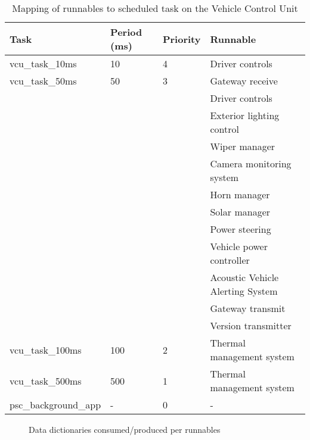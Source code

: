 \begin{table}[htb]
    \centering
\begin{tabular}{@{}llll@{}}
    \toprule
    Task                           & Period (ms) & Priority & Runnable                     \\ \midrule
    vcu\_task\_10ms                & 10          & 4        & Driver controls              \\
    vcu\_task\_50ms                & 50          & 3        & Gateway receive              \\
                                   &             &          & Driver controls              \\
                                   &             &          & Exterior lighting control    \\
                                   &             &          & Wiper manager                \\
                                   &             &          & Camera monitoring system     \\
                                   &             &          & Horn manager                 \\
                                   &             &          & Solar manager                \\
                                   &             &          & Power steering               \\
                                   &             &          & Vehicle power controller     \\
                                   &             &          & Acoustic Vehicle Alerting System \\
                                   &             &          & Gateway transmit             \\
                                   &             &          & Version transmitter          \\
    vcu\_task\_100ms               & 100         & 2        & Thermal management system    \\
    vcu\_task\_500ms               & 500         & 1        & Thermal management system    \\
    psc\_background\_app           & -           & 0        & -                            \\ \bottomrule
    \end{tabular}
    \caption{Mapping of runnables to scheduled task on the Vehicle Control Unit}
    \label{tab:runnable_mapping_vcu}
\end{table}
\begin{figure}[htb]
    \centering
    
    \caption{Data dictionaries consumed/produced per runnables}
    \label{fig:produce_consume_runnable}
\end{figure}

